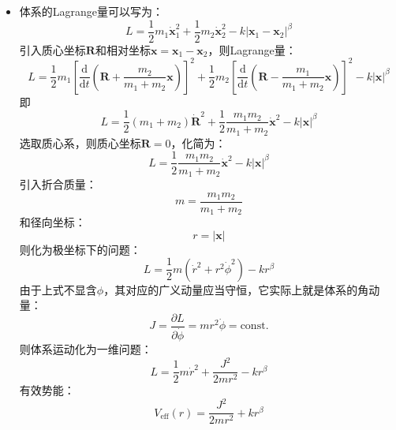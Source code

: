\documentclass[a4paper,fontset=windows]{ctexart}
\begin{document}
\begin{itemize}
\[\begin{bmatrix}
            0 &\varOmega_y^2
        \end{bmatrix}
        \cdot\bm{X}
        \]
        对于两个不共线的Lagrange点：
        \[
        \left.\begin{bmatrix}
            \partial_x^2 V_{\mathrm{eff}} &\partial_x\partial_y V_{\mathrm{eff}} \\
            \partial_y\partial_x V_{\mathrm{eff}} &\partial_y^2 V_{\mathrm{eff}}
        \end{bmatrix}\right|_{x=x_L}
        =-3\pi^2
        \begin{bmatrix}
            1 &\sqrt{3}\lambda \\
            \sqrt{3}\lambda &3
        \end{bmatrix}
        \]
        则偏离Lagrange点的有效势能的修正：
        \[
        \delta V_{\mathrm{eff}} = -\frac{3\pi^2}{2}\bm{X}^T\cdot
        \begin{bmatrix}
            1 &\sqrt{3}\lambda \\
            \sqrt{3}\lambda &3
        \end{bmatrix}
        \cdot\bm{X}
        \]
        \bigskip

        \item[5.(a)]
        体系的Lagrange量可以写为：
        \[
        L = \frac{1}{2}m_1\dot{\bm{x}}_1^2 + \frac{1}{2}m_2\dot{\bm{x}}_2^2 - k|\bm{x}_1-\bm{x}_2|^\beta
        \]
        引入质心坐标$\bm{R}$和相对坐标$\bm{x} = \bm{x}_1 - \bm{x}_2$，则Lagrange量：
        \[
        L = \frac{1}{2}m_1\left[\frac{\mathrm{d}}{\mathrm{d}t}\left(\bm{R} + \frac{m_2}{m_1+m_2}\bm{x}\right)\right]^2 + \frac{1}{2}m_2\left[\frac{\mathrm{d}}{\mathrm{d}t}\left(\bm{R} - \frac{m_1}{m_1+m_2}\bm{x}\right)\right]^2 - k|\bm{x}|^\beta
        \]
        即
        \[
        L = \frac{1}{2}(m_1+m_2)\dot{\bm{R}}^2 + \frac{1}{2}\frac{m_1m_2}{m_1+m_2}\dot{\bm{x}}^2 - k|\bm{x}|^\beta
        \]
        选取质心系，则质心坐标$\bm{R} = 0$，化简为：
        \[
        L = \frac{1}{2}\frac{m_1m_2}{m_1+m_2}\dot{\bm{x}}^2 - k|\bm{x}|^\beta
        \]
        引入折合质量：
        \[
        m = \frac{m_1m_2}{m_1+m_2}
        \]
        和径向坐标：
        \[
        r = |\bm{x}|
        \]
        则化为极坐标下的问题：
        \[
        L = \frac{1}{2}m\left(\dot{r}^2 + r^2\dot{\phi}^2\right) - kr^\beta
        \]
        由于上式不显含$\phi$，其对应的广义动量应当守恒，它实际上就是体系的角动量：
        \[
        J = \frac{\partial L}{\partial\dot{\phi}} = mr^2\dot{\phi} = \mathrm{const.}
        \]
        则体系运动化为一维问题：
        \[
        L = \frac{1}{2}m\dot{r}^2 + \frac{J^2}{2mr^2} - kr^\beta
        \]
        有效势能：
        \[
        V_{\mathrm{eff}}(r) = \frac{J^2}{2mr^2} + kr^\beta
        \]
        \medskip


\end{itemize}
\end{document}
